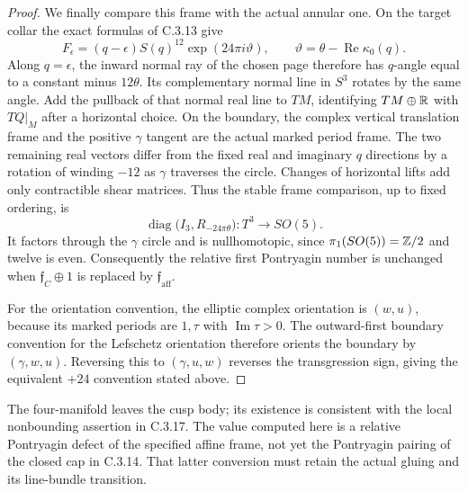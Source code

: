 \begin{proof}
We finally compare this frame with the actual annular one.
On the target collar the exact formulas of C.3.13 give
\[
 F_\epsilon=(q-\epsilon)S(q)^{12}
              \exp(24\pi i\vartheta),
 \qquad\vartheta=\theta-\operatorname{Re}\kappa_0(q).
\]
Along $q=\epsilon$, the inward normal ray of the chosen page
therefore has $q$-angle equal to a constant minus $12\theta$.
Its complementary normal line in $S^3$ rotates by the same
angle. Add the pullback of that normal real line to $TM$,
identifying $TM\oplus\mathbb R$ with $TQ|_M$ after a horizontal
choice. On the boundary, the complex vertical translation
frame and the positive $\gamma$ tangent are the actual marked
period frame. The two remaining real vectors differ from
the fixed real and imaginary $q$ directions by a rotation
of winding $-12$ as $\gamma$ traverses the circle. Changes
of horizontal lifts add only contractible shear matrices.
Thus the stable frame comparison, up to fixed ordering, is
\[
 \operatorname{diag}\bigl(I_3,R_{-24\pi\theta}\bigr):
 T^3\longrightarrow SO(5).
\]
It factors through the $\gamma$ circle and is nullhomotopic,
since $\pi_1(SO(5))=\mathbb Z/2$ and twelve is even. Consequently
the relative first Pontryagin number is unchanged when
$\mathfrak f_C\oplus1$ is replaced by
$\mathfrak f_{\mathrm{aff}}$.

For the orientation convention, the elliptic complex orientation
is $(w,u)$, because its marked periods are $1,\tau$ with
$\operatorname{Im}\tau>0$. The outward-first boundary convention
for the Lefschetz orientation therefore orients the boundary
by $(\gamma,w,u)$. Reversing this to $(\gamma,u,w)$ reverses
the transgression sign, giving the equivalent $+24$ convention
stated above.
\end{proof}

\begin{remark}[Scope]
The four-manifold leaves the cusp body; its existence is
consistent with the local nonbounding assertion in C.3.17.
The value computed here is a relative Pontryagin defect of
the specified affine frame, not yet the Pontryagin pairing
of the closed cap in C.3.14. That latter conversion must
retain the actual gluing and its line-bundle transition.
\end{remark}
